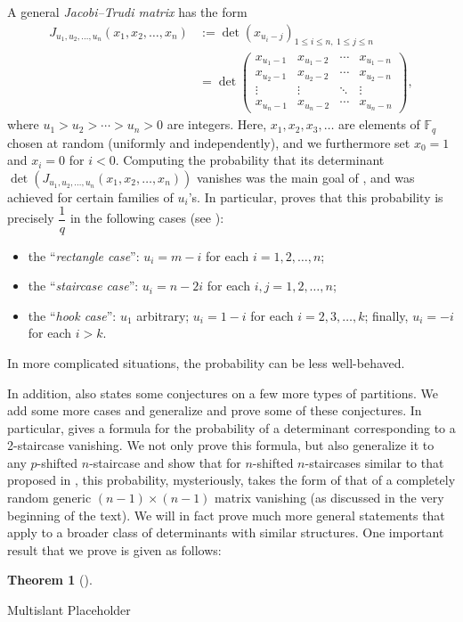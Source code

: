 \documentclass[numbers=enddot,12pt,final,onecolumn,notitlepage]{scrartcl}%
\theoremstyle{definition}
\newtheorem{theo}{Theorem}[section]
\newenvironment{theorem}[1][]
{\begin{theo}[#1]\begin{leftbar}}
{\end{leftbar}\end{theo}}
\newcommand{\tup}[1]{\left( #1 \right)}
\newcommand{\Fq}{\mathbb{F}_q}
\renewcommand{\leq}{\leqslant}
\theoremstyle{plainsl}
\begin{document}
A general \emph{Jacobi--Trudi matrix} has the form
\begin{align*}
J_{u_1, u_2, \ldots, u_n}\tup{x_1, x_2, \ldots, x_n}
&:=
\det \left(  x_{u_{i}-j}\right)_{1\leq i\leq n,\ 1\leq j\leq n}
\\
&= \det \begin{pmatrix}
x_{u_1 - 1} & x_{u_1 - 2} & \cdots & x_{u_1 - n} \\
x_{u_2 - 1} & x_{u_2 - 2} & \cdots & x_{u_2 - n} \\
\vdots & \vdots & \ddots & \vdots \\
x_{u_n - 1} & x_{u_n - 2} & \cdots & x_{u_n - n}
\end{pmatrix} ,
\end{align*}
where $u_{1}>u_{2}>\cdots>u_{n}>0$ are integers.
Here, $x_1, x_2, x_3, \ldots$ are elements of $\Fq$ chosen at random (uniformly and independently), and we furthermore set $x_{0}=1$ and $x_{i}=0$ for $i<0$.
Computing the probability that its determinant
$\det\tup{ J_{u_1, u_2, \ldots, u_n}\tup{x_1, x_2, \ldots, x_n} }$
vanishes was the main goal of
\cite{Anzis18}, and was achieved for certain families of
$u_i$'s.
In particular, \cite{Anzis18} proves that this probability is precisely $\dfrac{1}{q}$ in the following cases (see \cite[Corollary 6.4, Theorem 6.5, Proposition 1.2]{Anzis18}):
\begin{itemize}
\item the ``\emph{rectangle case}'': $u_i = m - i$ for each $i = 1, 2, \ldots, n$;
\item the ``\emph{staircase case}'': $u_i = n - 2i$ for each $i,j = 1, 2, \ldots, n$;
\item the ``\emph{hook case}'': $u_1$ arbitrary; $u_i = 1 - i$ for
each $i = 2, 3, \ldots, k$; finally, $u_i = -i$ for each $i > k$.
\end{itemize}
In more complicated situations, the probability can be less well-behaved.



In addition, \cite{Anzis18} also states some conjectures on a few more types of partitions.
We add some more cases and generalize and prove some of these conjectures.
In particular, \cite[Conjecture 10.1]{Anzis18} gives a formula for the probability of a determinant corresponding to a 2-staircase vanishing. We not only prove this formula, but also generalize it to any $p$-shifted $n$-staircase and show that for $n$-shifted $n$-staircases similar to that proposed in \cite[Conjecture 10.1]{Anzis18}, this probability, mysteriously, takes the form of that of a completely random generic $(n-1)\times (n-1)$ matrix vanishing (as discussed in the very beginning of the text). We will in fact prove much more general statements that apply to a broader class of determinants with similar structures. One important result that we prove is given as follows:
\begin{theorem}
Multislant Placeholder
\end{theorem}
\end{document}
